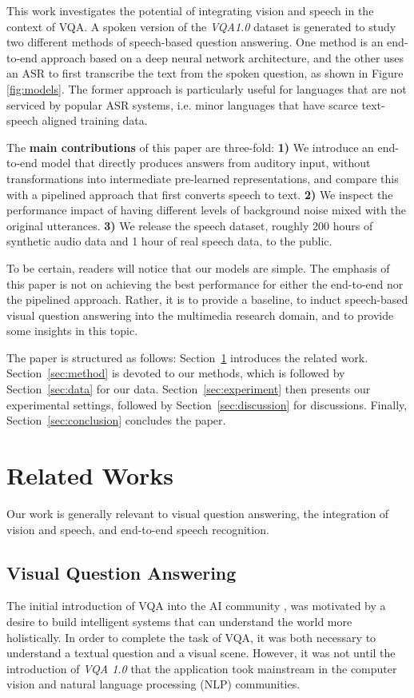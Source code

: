 \documentclass[letterpaper]{article} %
\begin{document}
This work investigates the potential of integrating vision and speech in the context of VQA. A spoken version of the \textit{VQA1.0} dataset is generated to study two different methods of speech-based question answering. One method is an end-to-end approach based on a deep neural network architecture, and the other uses an ASR to first transcribe the text from the spoken question, as shown in Figure \ref{fig:models}. The former approach is particularly useful for languages that are not serviced by popular ASR systems, i.e. minor languages that have scarce text-speech aligned training data.

The \textbf{main contributions} of this paper are three-fold: \textbf{1)} We introduce an end-to-end model that directly produces answers from auditory input, without transformations into intermediate pre-learned representations, and compare this with a pipelined approach that first converts speech to text. \textbf{2)} We inspect the performance impact of having different levels of background noise mixed with the original utterances. \textbf{3)} We release the speech dataset, roughly 200 hours of synthetic audio data and 1 hour of real speech data, to the public.

To be certain, readers will notice that our models are simple. The emphasis of this paper is not on achieving the best performance for either the end-to-end nor the pipelined approach. Rather, it is to provide a baseline, to induct speech-based visual question answering into the multimedia research domain, and to provide some insights in this topic.

The paper is structured as follows: Section~\ref{sec:related} introduces the related work. Section~\ref{sec:method} is devoted to our methods, which is followed by Section~\ref{sec:data} for our data. Section~\ref{sec:experiment} then presents our experimental settings, followed by Section~\ref{sec:discussion} for discussions. Finally, Section~\ref{sec:conclusion} concludes the paper.   

\section{Related Works}
\label{sec:related}
Our work is generally relevant to visual question answering, the integration of vision and speech, and end-to-end speech recognition.

\subsection{Visual Question Answering}
The initial introduction of VQA into the AI community ,  was motivated by a desire to build intelligent systems that can understand the world more holistically. In order to complete the task of VQA, it was both necessary to understand a textual question and a visual scene. However, it was not until the introduction of \textit{VQA 1.0}  that the application took mainstream in the computer vision and natural language processing (NLP) communities.
\end{document}
